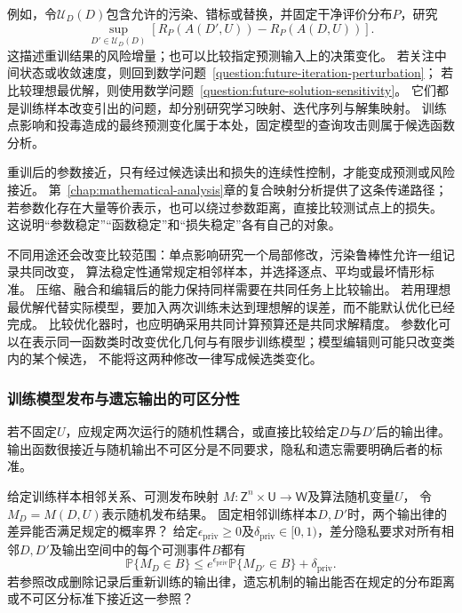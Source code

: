 例如，令$\mathcal U_D(D)$包含允许的污染、错标或替换，并固定干净评价分布$P$，研究
\begin{equation}
  \sup_{D'\in\mathcal U_D(D)}
  \left[R_P(A(D',U))-R_P(A(D,U))\right].
  \label{eq:future-training-robustness-question}
\end{equation}
这描述重训结果的风险增量；也可以比较指定预测输入上的决策变化。
若关注中间状态或收敛速度，则回到数学问题~\ref{question:future-iteration-perturbation}；
若比较理想最优解，则使用数学问题~\ref{question:future-solution-sensitivity}。
它们都是训练样本改变引出的问题，却分别研究学习映射、迭代序列与解集映射。
训练点影响和投毒造成的最终预测变化属于本处，固定模型的查询攻击则属于候选函数分析。

重训后的参数接近，只有经过候选读出和损失的连续性控制，才能变成预测或风险接近。
第~\ref{chap:mathematical-analysis}章的复合映射分析提供了这条传递路径；
若参数化存在大量等价表示，也可以绕过参数距离，直接比较测试点上的损失。
这说明“参数稳定”“函数稳定”和“损失稳定”各有自己的对象。

不同用途还会改变比较范围：单点影响研究一个局部修改，污染鲁棒性允许一组记录共同改变，
算法稳定性通常规定相邻样本，并选择逐点、平均或最坏情形标准。
压缩、融合和编辑后的能力保持同样需要在共同任务上比较输出。
若用理想最优解代替实际模型，要加入两次训练未达到理想解的误差，而不能默认优化已经完成。
比较优化器时，也应明确采用共同计算预算还是共同求解精度。
参数化可以在表示同一函数类时改变优化几何与有限步训练模型；模型编辑则可能只改变类内的某个候选，
不能将这两种修改一律写成候选类变化。

\subsubsection{训练模型发布与遗忘输出的可区分性}
\label{sec:future-analysis-output-law}

若不固定$U$，应规定两次运行的随机性耦合，或直接比较给定$D$与$D'$后的输出律。
输出函数很接近与随机输出不可区分是不同要求，隐私和遗忘需要明确后者的标准。

\begin{mathproblem}[随机输出律的可区分程度]
  \label{question:future-output-law}
  给定训练样本相邻关系、可测发布映射
  $M:\mathsf Z^n\times\mathsf U\to\mathsf W$及算法随机变量$U$，
  令$M_D=M(D,U)$表示随机发布结果。
  固定相邻训练样本$D,D'$时，两个输出律的差异能否满足规定的概率界？
  给定$\epsilon_{\mathrm{priv}}\geq0$及$\delta_{\mathrm{priv}}\in[0,1)$，差分隐私要求对所有相邻$D,D'$及输出空间中的每个可测事件$B$都有
  \[
    \mathbb P\{M_D\in B\}
    \leq e^{\epsilon_{\mathrm{priv}}}
       \mathbb P\{M_{D'}\in B\}+\delta_{\mathrm{priv}}.
  \]
  若参照改成删除记录后重新训练的输出律，遗忘机制的输出能否在规定的分布距离
  或不可区分标准下接近这一参照？
\end{mathproblem}

